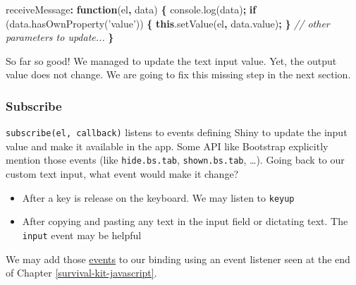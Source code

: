 \documentclass[
]{book}
\newenvironment{Shaded}{\begin{snugshade}}{\end{snugshade}}
\newcommand{\AttributeTok}[1]{\textcolor[rgb]{0.77,0.63,0.00}{#1}}
\newcommand{\CommentTok}[1]{\textcolor[rgb]{0.56,0.35,0.01}{\textit{#1}}}
\newcommand{\ControlFlowTok}[1]{\textcolor[rgb]{0.13,0.29,0.53}{\textbf{#1}}}
\newcommand{\KeywordTok}[1]{\textcolor[rgb]{0.13,0.29,0.53}{\textbf{#1}}}
\newcommand{\NormalTok}[1]{#1}
\newcommand{\OperatorTok}[1]{\textcolor[rgb]{0.81,0.36,0.00}{\textbf{#1}}}
\newcommand{\StringTok}[1]{\textcolor[rgb]{0.31,0.60,0.02}{#1}}
\newcommand{\VariableTok}[1]{\textcolor[rgb]{0.00,0.00,0.00}{#1}}
\providecommand{\tightlist}{%
  \setlength{\itemsep}{0pt}\setlength{\parskip}{0pt}}
\begin{document}
\begin{Shaded}
\begin{Highlighting}[]
\NormalTok{receiveMessage}\OperatorTok{:} \KeywordTok{function}\NormalTok{(el}\OperatorTok{,}\NormalTok{ data) }\OperatorTok{\{}
  \VariableTok{console}\NormalTok{.}\AttributeTok{log}\NormalTok{(data)}\OperatorTok{;}
  \ControlFlowTok{if}\NormalTok{ (}\VariableTok{data}\NormalTok{.}\AttributeTok{hasOwnProperty}\NormalTok{(}\StringTok{'value'}\NormalTok{)) }\OperatorTok{\{}
    \KeywordTok{this}\NormalTok{.}\AttributeTok{setValue}\NormalTok{(el}\OperatorTok{,} \VariableTok{data}\NormalTok{.}\AttributeTok{value}\NormalTok{)}\OperatorTok{;}
  \OperatorTok{\}}
  \CommentTok{// other parameters to update...}
\OperatorTok{\}}
\end{Highlighting}
\end{Shaded}

So far so good! We managed to update the text input value. Yet, the output value does not change. We are going to fix this missing step in the next section.

\hypertarget{subscribe}{%
\subsubsection{Subscribe}\label{subscribe}}

\texttt{subscribe(el,\ callback)} listens to events defining Shiny to update the input value and make it available in the app. Some API like Bootstrap explicitly mention those events (like \texttt{hide.bs.tab}, \texttt{shown.bs.tab}, \ldots).
Going back to our custom text input, what event would make it change?

\begin{itemize}
\tightlist
\item
  After a key is release on the keyboard. We may listen to \texttt{keyup}
\item
  After copying and pasting any text in the input field or dictating text. The \texttt{input} event may be helpful
\end{itemize}

We may add those \href{https://javascript.info/events-change-input}{events} to our binding using an event listener seen at the end of Chapter \ref{survival-kit-javascript}.

\begin{Shaded}
\end{Shaded}
\end{document}

